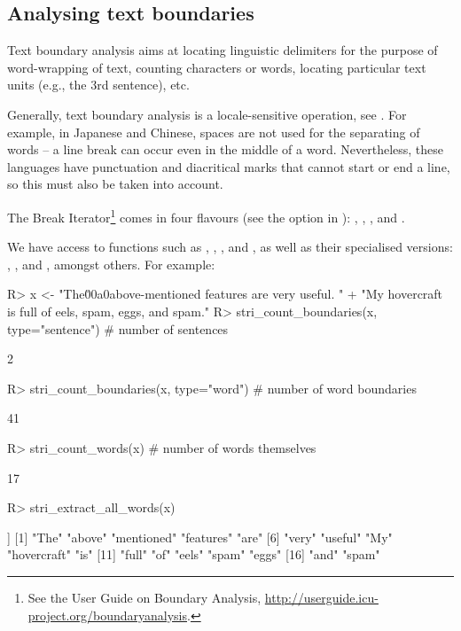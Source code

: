 \documentclass[nojss]{jss}
\begin{document}
\subsection{Analysing text boundaries}\label{Sec:BoundaryAnalysis}

Text boundary analysis aims at locating linguistic delimiters
for the purpose of word-wrapping of text, counting characters or
words, locating particular text units (e.g.,
the 3rd sentence), etc.

Generally, text boundary analysis is a locale-sensitive operation,
see \citep{usa29:segmentation}.
For example, in Japanese and Chinese, spaces are not used for
the separating of words --
a line break can occur even in the middle of a word. Nevertheless,
these languages have punctuation and diacritical marks that cannot
start or end a line, so this must also be taken into account.

The  Break Iterator\footnote{See the  User Guide
on {Boundary Analysis}, \url{http://userguide.icu-project.org/boundaryanalysis}.}
comes in four flavours (see the  option
in ):
, , , and .

We have access to functions such as
,
,
, and
,
as well as their specialised
versions:
,
, and
, amongst others.
For example:


\begin{Schunk}
\begin{Sinput}
R> x <- "The\u00a0above-mentioned    features are very useful. " %s+%
+       "My hovercraft is full of eels, spam, eggs, and spam."
R> stri_count_boundaries(x, type="sentence")  # number of sentences
\end{Sinput}
\begin{Soutput}
[1] 2
\end{Soutput}
\begin{Sinput}
R> stri_count_boundaries(x, type="word")  # number of word boundaries
\end{Sinput}
\begin{Soutput}
[1] 41
\end{Soutput}
\begin{Sinput}
R> stri_count_words(x)                    # number of words themselves
\end{Sinput}
\begin{Soutput}
[1] 17
\end{Soutput}
\begin{Sinput}
R> stri_extract_all_words(x)
\end{Sinput}
\begin{Soutput}
[[1]]
 [1] "The"        "above"      "mentioned"  "features"   "are"
 [6] "very"       "useful"     "My"         "hovercraft" "is"
[11] "full"       "of"         "eels"       "spam"       "eggs"
[16] "and"        "spam"
\end{Soutput}
\end{Schunk}
\end{document}
